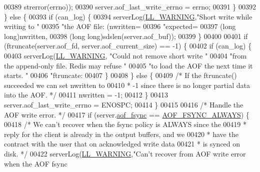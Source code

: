 \begin{DoxyCode}
{{{{00389                     strerror(errno));
00390                 server.aof\_last\_write\_errno = errno;
00391             \}
00392         \} \textcolor{keywordflow}{else} \{
00393             \textcolor{keywordflow}{if} (can\_log) \{
00394                 serverLog(\hyperlink{server_8h_a31229b9334bba7d6be2a72970967a14b}{LL\_WARNING},\textcolor{stringliteral}{"Short write while writing to "}
00395                                        \textcolor{stringliteral}{"the AOF file: (nwritten=%
00396                                        \textcolor{stringliteral}{"expected=%
00397                                        (\textcolor{keywordtype}{long} \textcolor{keywordtype}{long})nwritten,
00398                                        (\textcolor{keywordtype}{long} \textcolor{keywordtype}{long})sdslen(server.aof\_buf));
00399             \}
00400 
00401             \textcolor{keywordflow}{if} (ftruncate(server.aof\_fd, server.aof\_current\_size) == -1) \{
00402                 \textcolor{keywordflow}{if} (can\_log) \{
00403                     serverLog(\hyperlink{server_8h_a31229b9334bba7d6be2a72970967a14b}{LL\_WARNING}, \textcolor{stringliteral}{"Could not remove short write "}
00404                              \textcolor{stringliteral}{"from the append-only file.  Redis may refuse "}
00405                              \textcolor{stringliteral}{"to load the AOF the next time it starts.  "}
00406                              \textcolor{stringliteral}{"ftruncate: %
00407                 \}
00408             \} \textcolor{keywordflow}{else} \{
00409                 \textcolor{comment}{/* If the ftruncate() succeeded we can set nwritten to}
00410 \textcolor{comment}{                 * -1 since there is no longer partial data into the AOF. */}
00411                 nwritten = -1;
00412             \}
00413             server.aof\_last\_write\_errno = ENOSPC;
00414         \}
00415 
00416         \textcolor{comment}{/* Handle the AOF write error. */}
00417         \textcolor{keywordflow}{if} (server.\hyperlink{config_8h_af5994c643c434574580bb7816af82cad}{aof\_fsync} == \hyperlink{server_8h_a83bfec10b7b4be60ec6d5868cadc73bb}{AOF\_FSYNC\_ALWAYS}) \{
00418             \textcolor{comment}{/* We can't recover when the fsync policy is ALWAYS since the}
00419 \textcolor{comment}{             * reply for the client is already in the output buffers, and we}
00420 \textcolor{comment}{             * have the contract with the user that on acknowledged write data}
00421 \textcolor{comment}{             * is synced on disk. */}
00422             serverLog(\hyperlink{server_8h_a31229b9334bba7d6be2a72970967a14b}{LL\_WARNING},\textcolor{stringliteral}{"Can't recover from AOF write error when the AOF fsync
}}}}}}}}
\end{DoxyCode}
